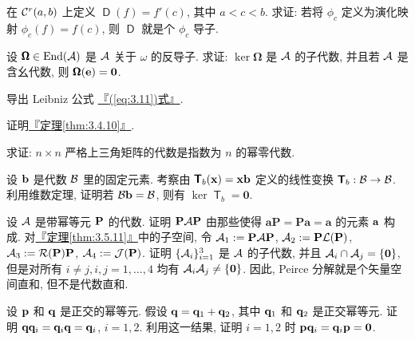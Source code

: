 \documentclass[lang=cn,zihao=-4,twoside,fontset=none]{textbook}
\newcommand{\lt}{<}
\DeclareMathOperator{\End}{End}
\newcommand{\bsf}[1]{{\mathop{\pmb{\mathsf{#1}}}}}
\newcommand{\BOmega}{{\pmb{\Omega}}}
\renewcommand{\eqref}[1]{\hyperref[#1]{『\textnormal{(\ref*{#1})}式』}}
\newcommand{\thmref}[1]{\hyperref[#1]{『定理\textnormal{\ref*{#1}}』}}
\newcommand{\set}[1]{\{#1\}}
\newcommand{\bfnull}{\mathbf{0}}
\begin{document}
\begin{problem}
    \label{ex:3.27}%
    在 ${\mathcal C}^r(a,b)$ 上定义 $\bsf{D}(f)=f'(c)$, 其中 $a\lt c\lt b$. 求证: 若将 $\phi_c$ 定义为演化映射 $\phi_c(f)=f(c)$, 则 $\bsf{D}$ 就是个 $\phi_c$ 导子.
\end{problem}

\begin{problem}
    \label{ex:3.28}%
    设 $\BOmega\in\End(\mA)$ 是 ${\mathcal A}$ 关于 $\omega$ 的反导子. 求证: $\ker\BOmega$ 是 ${\mathcal A}$ 的子代数, 并且若 ${\mathcal A}$ 是含幺代数, 则 $\BOmega(\bfe)=\bfnull$.
\end{problem}

\begin{problem}
    \label{ex:3.29}%
    导出 Leibniz 公式 \eqref{eq:3.11}.
\end{problem}


\begin{problem}
    \label{ex:3.30}%
    证明\thmref{thm:3.4.10}.
\end{problem}

\begin{problem}
    \label{ex:3.31}%
    求证: $n\times n$ 严格上三角矩阵的代数是指数为 $n$ 的幂零代数.
\end{problem}


\begin{problem}
    \label{ex:3.32}%
    设 ${\mathbf b}$ 是代数 ${\mathcal B}$ 里的固定元素. 考察由 $\bsf{T}_b(\bfx)=\bfx\bfb$ 定义的线性变换 $\bsf{T}_b:\mB\to\mB$. 利用维数定理, 证明若 ${\mathcal B}{\mathbf b}={\mathcal B}$, 则有 $\ker\bsf{T}_b=\bfnull$.
\end{problem}

\begin{problem}
    \label{ex:3.33}%
    设 ${\mathcal A}$ 是带幂等元 ${\mathbf P}$ 的代数. 证明 ${\mathbf P}{\mathcal A}{\mathbf P}$ 由那些使得 $\mathbf{aP}=\mathbf{Pa}=\mathbf{a}$ 的元素 ${\mathbf a}$ 构成. 对\thmref{thm:3.5.11}中的子空间, 令 ${\mathcal A}_1:={\mathbf P}{\mathcal A}{\mathbf P}$, ${\mathcal A}_2:={\mathbf P}{\mathcal L}({\mathbf P})$, ${\mathcal A}_3:={\mathcal R}({\mathbf P}){\mathbf P}$, ${\mathcal A}_4:= {\mathcal J}({\mathbf P})$. 证明 $\set{\mA_i}_{i=1}^3$ 是 ${\mathcal A}$ 的子代数, 并且 $\mA_i\cap\mA_j=\set{\bfnull}$, 但是对所有 $i\neq j,i,j=1,\dots,4$ 均有 $\mA_i\mA_j\neq\set{\bfnull}$. 因此, Peirce 分解就是个矢量空间直和, 但不是代数直和.
\end{problem}

\begin{problem}
    \label{ex:3.34}%
    设 ${\mathbf p}$ 和 ${\mathbf q}$ 是正交的幂等元. 假设 ${\mathbf q}={\mathbf q}_1+{\mathbf q}_2$, 其中 ${\mathbf q}_1$ 和 ${\mathbf q}_2$ 是正交幂等元. 证明 ${\mathbf q}{\mathbf q}_i={\mathbf q}_i{\mathbf q}={\mathbf q}_i$, $i=1,2$. 利用这一结果, 证明 $i=1,2$ 时 $\bfp\bfq_i=\bfq_i\bfp=\bfnull$.
\end{problem}
\end{document}

